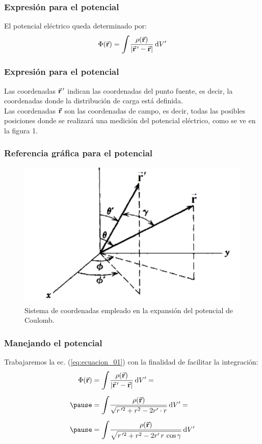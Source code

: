 \documentclass[12pt]{beamer}
\begin{document}
\begin{frame}
\frametitle{Expresión para el potencial}
El potencial eléctrico queda determinado por:
\pause
\begin{align}
\Phi (\va{r}) = \scaleint{6ex} \dfrac{\rho(\va{r})}{\abs{\va{r}^{\, \prime} - \va{r}}} \dd{V^{\prime}}
\label{eq:ecuacion_01}
\end{align}
\end{frame}
\begin{frame}
\frametitle{Expresión para el potencial}
Las coordenadas $\va{r}^{\, \prime}$ indican las coordenadas del punto fuente, es decir, la coordenadas donde la distribución de carga está definida.
\\
\bigskip
\pause
Las coordenadas $\va{r}$ son las coordenadas de campo, es decir, todas las posibles posiciones donde se realizará una medición del potencial eléctrico, como se ve en la figura 1.
\end{frame}
\begin{frame}
\frametitle{Referencia gráfica para el potencial}
\begin{figure}
    \centering
    \includegraphics[scale=0.45]{Imagenes/Potencial_Coulomb.png}
    \caption{Sistema de coordenadas empleado en la expansión del potencial de Coulomb.}
    \label{fig:figura_01}
\end{figure}
\end{frame}
\begin{frame}
\frametitle{Manejando el potencial}
Trabajaremos la ec. (\ref{eq:ecuacion_01}) con la finalidad de facilitar la integración:
\begin{eqnarray}
\begin{aligned}[b]
\Phi (\va{r}) &= \scaleint{6ex} \dfrac{\rho(\va{r})}{\abs{\va{r}^{\, \prime} - \va{r}}} \dd{V^{\prime}} = \\[0.5em] \pause
&= \scaleint{6ex} \dfrac{\rho(\va{r})}{\sqrt{r^{\, \prime 2} + r^{2} - 2 r^{\prime} \cdot r}} \dd{V^{\prime}} = \\[0.5em] \pause
&= \scaleint{6ex} \dfrac{\rho(\va{r})}{\sqrt{r^{\, \prime 2} + r^{2} - 2 r^{\prime} \, r \, \cos \gamma }} \dd{V^{\prime}}
\end{aligned}
\label{eq:ecuacion_02}
\end{eqnarray}
\end{frame}
\end{document}

